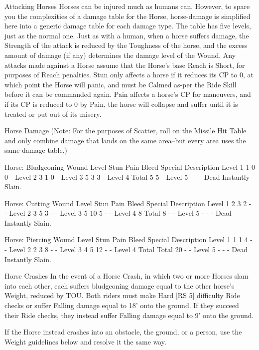 \documentclass[oneside,11pt,english]{book}
\begin{document}
 

 

Attacking Horses 
Horses can be injured much as humans can. However, to spare you the complexities of a damage table for 
the Horse, horse-damage is simplified here into a generic damage table for each damage type. The table 
has five levels, just as the normal one. 
Just as with a human, when a horse suffers damage, the Strength of the attack is reduced by the 
Toughness of the horse, and the excess amount of damage (if any) determines the damage level of the 
Wound. 
Any attacks made against a Horse assume that the Horse’s base Reach is Short, for purposes of Reach 
penalties. 
Stun only affects a horse if it reduces its CP to 0, at which point the Horse will panic, and must be 
Calmed as-per the Ride Skill before it can be commanded again. 
Pain affects a horse's CP for maneuvers, and if its CP is reduced to 0 by Pain, the horse will collapse and 
suffer until it is treated or put out of its misery. 

 

Horse Damage 
(Note: For the purposes of Scatter, roll on the Missile Hit Table and only combine damage that lands on 
the same area--but every area uses the same damage table.) 


 

Horse: Bludgeoning 
Wound Level Stun Pain Bleed Special Description 
Level 1 1 0 0 - 
Level 2 3 1 0 - 
Level 3 5 3 3 - 
Level 4 Total 5 5 - 
Level 5 - - - Dead Instantly Slain. 

 
Horse: Cutting 
Wound Level Stun Pain Bleed Special Description 
Level 1 2 3 2 - - 
Level 2 3 5 3 - - 
Level 3 5 10 5 - - 
Level 4 8 Total 8 - - 
Level 5 - - - Dead Instantly Slain. 

 
Horse: Piercing 
Wound Level Stun Pain Bleed Special Description 
Level 1 1 1 4 - - 
Level 2 2 3 8 - - 
Level 3 4 5 12 - - 
Level 4 Total Total 20 - - 
Level 5 - - - Dead Instantly Slain. 

 

 

Horse Crashes 
In the event of a Horse Crash, in which two or more Horses slam into each other, each suffers 
bludgeoning damage equal to the other horse’s Weight, reduced by TOU. Both riders must make Hard 
[RS 5] difficulty Ride checks or suffer Falling damage equal to 18' onto the ground. If they succeed their 
Ride checks, they instead suffer Falling damage equal to 9’ onto the ground. 

 

If the Horse instead crashes into an obstacle, the ground, or a person, use the Weight guidelines below 
and resolve it the same way. 
\end{document}
